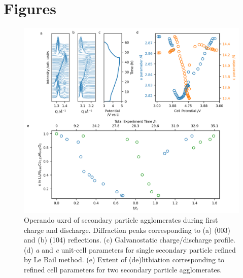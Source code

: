 \documentclass{article}
\begin{document}
\newpage
\section*{Figures}

\begin{figure}[!h]
  \includegraphics{figures/NCA_xrd.png}
  \caption{ Operando \gls{uxrd} of \nca{} secondary particle
    agglomerates during first charge and discharge. Diffraction peaks
    corresponding to (a) (003) and (b) (104) reflections. (c)
    Galvanostatic charge/discharge profile. (d) \textit{a} and
    \textit{c} unit-cell parameters for single secondary particle
    refined by Le Bail method. (e) Extent of (de)lithiation
    corresponding to refined cell parameters\cite{robert2015} for two
    secondary particle agglomerates.}
  \label{fig:uxrd}
\end{figure}
\end{document}
